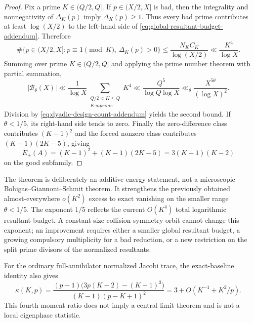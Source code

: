 \begin{proof}
Fix a prime $K\in(Q/2,Q]$.  If $p\in(X/2,X]$ is bad, then the integrality and
nonnegativity of $\Delta_K(p)$ imply $\Delta_K(p)\ge1$.  Thus every bad prime
contributes at least $\log(X/2)$ to the left-hand side of
\eqref{eq:global-resultant-budget-addendum}.  Therefore
\[
 \#\{p\in(X/2,X]:p\equiv1\pmod K,\ \Delta_K(p)>0\}
 \le \frac{N_KC_K}{\log(X/2)}
 \ll \frac{K^4}{\log X}.
\]
Summing over prime $K\in(Q/2,Q]$ and applying the prime number theorem with
partial summation,
\[
 |\mathcal B_\theta(X)|
 \ll \frac1{\log X}
       \sum_{\substack{Q/2<K\le Q\\K\ {
m prime}}}K^4
 \ll \frac{Q^5}{\log Q\log X}
 \ll_\theta \frac{X^{5\theta}}{(\log X)^2}.
\]
Division by \eqref{eq:dyadic-design-count-addendum} yields the second bound.
If $\theta<1/5$, its right-hand side tends to zero.  Finally the zero-difference
class contributes $(K-1)^2$ and the forced nonzero class contributes
$(K-1)(2K-5)$, giving
\[
 E_+(A)=(K-1)^2+(K-1)(2K-5)=3(K-1)(K-2)
\]
on the good subfamily.
\end{proof}

The theorem is deliberately an additive-energy statement, not a microscopic
Bohigas--Giannoni--Schmit theorem.  It strengthens the previously obtained
almost-everywhere $o(K^2)$ excess to exact vanishing on the smaller range
$\theta<1/5$.  The exponent $1/5$ reflects the current $O(K^4)$ total
logarithmic resultant budget.  A constant-size collision symmetry orbit cannot
change this exponent; an improvement requires either a smaller global
resultant budget, a growing compulsory multiplicity for a bad reduction, or a
new restriction on the split prime divisors of the normalized resultants.

For the ordinary full-annihilator normalized Jacobi trace, the exact-baseline
identity also gives
\[
 \kappa(K,p)
 =\frac{(p-1)\bigl(3p(K-2)-(K-1)^3\bigr)}
        {(K-1)(p-K+1)^2}
 =3+O\!\left(K^{-1}+K^2/p\right).
\]
This fourth-moment ratio does not imply a central limit theorem and is not a
local eigenphase statistic.
